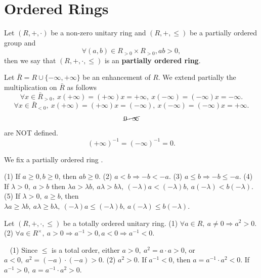 \section{Ordered Rings}
\begin{definitionenv}
    Let $(R,+,\cdot)$ be a non-zero unitary ring and $(R,+,\le)$ be a partially ordered group and 
    $$\forall (a,b)\in R_{>0}\times R_{>0}, ab>0,$$
    then we say that $(R,+,\cdot,\le)$ is an \textbf{partially ordered ring}.

    Let $\bar{R}=R\cup\{-\infty,+\infty\}$ be an enhancement of $R$. We extend partially the multiplication on $\bar{R}$ as follows
    $$\forall x\in \bar{R}_{>0},\  x(+\infty)=(+\infty)x=+\infty,\  x(-\infty)=(-\infty)x=-\infty.$$
    $$\forall x\in \bar{R}_{<0},\  x(+\infty)=(+\infty)x=(-\infty),\  x(-\infty)=(-\infty)x=+\infty.$$
    $$\cancel{0\cdot \infty}$$
    are NOT defined.
    $$(+\infty)^{-1}=(-\infty)^{-1}=0.$$
\end{definitionenv}
We fix a partially ordered ring . 
\begin{box2}
    (1) If $a\ge 0,b\ge 0$, then $ab\ge 0$.
    \newline
    (2) $a<b\Rightarrow -b< -a$.
    \newline
    (3) $a\le b\Rightarrow -b\le -a$.
    \newline
    (4) If $\lambda>0,\ a>b$ then $\lambda a>\lambda b,\ a\lambda>b\lambda,\ (-\lambda )a<(-\lambda)b,\ a(-\lambda)<b(-\lambda)$.
    \newline
    (5) If $\lambda>0, \ a\ge b$, then $\lambda a\ge \lambda b,\ a\lambda\ge b\lambda,\ (-\lambda )a\le (-\lambda)b,\ a(-\lambda)\le b(-\lambda)$.
\end{box2}
\begin{propositionenv}
    Let $(R,+,\cdot,\le)$ be a totally ordered unitary ring. 
    \newline
    (1) $\forall a\in R,\ a\not=0\Rightarrow a^2>0.$
    \newline
    (2) $\forall a\in R^\times,\ a>0\Rightarrow a^{-1}>0, a<0\Rightarrow a^{-1}<0.$ 
\end{propositionenv}
\begin{proofenv}
    \ \newline
    (1) Since $\le$ is a total order, either $a>0,\ a^2=a\cdot a >0$, or $a<0,\ a^2=(-a)\cdot(-a)>0$.
    \newline
    (2) $a^2>0$. If $a^{-1}<0$, then $a=a^{-1}\cdot a^2<0$. If $a^{-1}>0,\ a=a^{-1}\cdot a^2>0$.
\end{proofenv}
